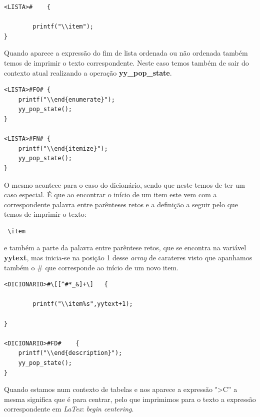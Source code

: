 \documentclass{article}
\begin{document}
\begin{verbatim}
<LISTA>#    {

        printf("\\item");
}
\end{verbatim}
Quando aparece a expressão do fim de lista ordenada ou não ordenada também temos de imprimir o texto correspondente. Neste caso temos também de sair do contexto atual realizando a operação \textbf{yy\_pop\_state}.
\begin{verbatim}
<LISTA>#FO# {
    printf("\\end{enumerate}");
    yy_pop_state();
}

<LISTA>#FN# {
    printf("\\end{itemize}");
    yy_pop_state();
}
\end{verbatim}
O mesmo acontece para o caso do dicionário, sendo que neste temos de ter um caso especial. É que ao encontrar o início de um item este vem com a correspondente palavra entre parênteses retos e a definição a seguir pelo que temos de imprimir o texto: \begin{verbatim} \item \end{verbatim} e também a parte da palavra entre parêntese retos, que se encontra na variável \textbf{yytext}, mas inicia-se na posição 1 desse \textit{array} de carateres visto que apanhamos também o \# que corresponde ao início de um novo item.
\begin{verbatim}
<DICIONARIO>#\[[^#*_&]+\]   {

        printf("\\item%s",yytext+1);
        
}

<DICIONARIO>#FD#    {
    printf("\\end{description}");
    yy_pop_state();
}
\end{verbatim}

Quando estamos num contexto de tabelas e nos aparece a expressão "\textgreater C'' a mesma significa que é para centrar, pelo que imprimimos para o texto a expressão correspondente em \textit{LaTex}: \textit{begin centering}.
\end{document}
